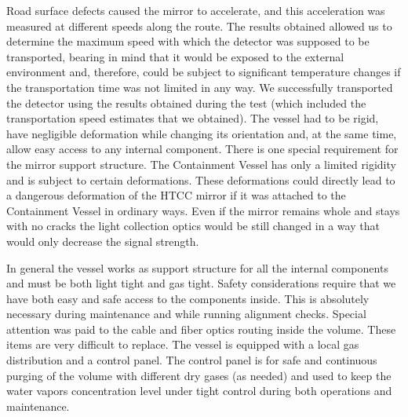   Road surface defects caused the mirror to accelerate, and this acceleration was measured at different speeds along the route. The results obtained allowed us to determine the maximum speed with which the detector was supposed to be transported, bearing in mind that it would be exposed to the external environment and, therefore, could be subject to significant temperature changes if the transportation time was not limited in any way. We successfully transported the detector using the results obtained during the test (which included the transportation speed estimates that we obtained). The vessel had to be rigid, have negligible deformation while changing its orientation and, at the same time, allow easy access to any internal component. There is one special requirement for the mirror support structure. The Containment Vessel has only a limited rigidity and is subject to certain deformations. These deformations could directly lead to a dangerous deformation of the HTCC mirror if it was attached to the Containment Vessel in ordinary ways. Even if the mirror remains whole and stays with no cracks the light collection optics would be still changed in a way that would only decrease the signal strength.

\indent In general the vessel works as support structure for all the internal components and must be both light tight and gas tight. Safety considerations require that we have both easy and safe access to the components inside. This is absolutely necessary during maintenance and while running alignment checks. Special attention was paid to the cable and fiber optics routing inside the volume. These items are very difficult to replace. The vessel is equipped with a local gas distribution and a control panel. The control panel is for safe and continuous purging of the volume with different dry gases (as needed) and used to keep the water vapors concentration level under tight control during both  operations and maintenance.

